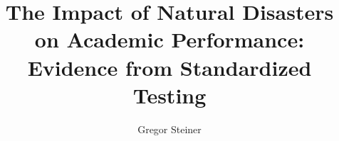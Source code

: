 \documentclass[11pt]{article}
\title{The Impact of Natural Disasters on Academic Performance: \\ Evidence from Standardized Testing}
\author{Gregor Steiner}
\begin{document}
\maketitle

\begin{abstract}
\end{abstract}















\end{document}
